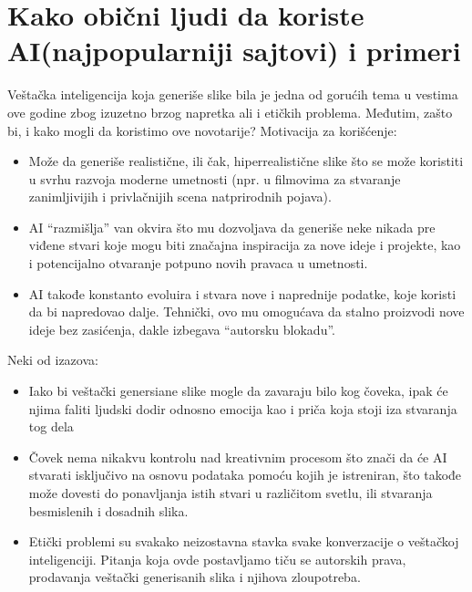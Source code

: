 \documentclass[12pt, letterpaper]{article}
\begin{document}
\section{Kako obični ljudi da koriste AI(najpopularniji sajtovi) i primeri}
Veštačka inteligencija koja generiše slike bila je jedna od gorućih tema u vestima ove godine zbog izuzetno brzog napretka ali i etičkih problema. Međutim, zašto bi, i kako mogli da koristimo ove novotarije?
Motivacija za korišćenje:
\begin{itemize}
  \item Može da generiše realistične, ili čak, hiperrealistične slike što se može koristiti u svrhu razvoja moderne umetnosti (npr. u filmovima za stvaranje zanimljivijih i privlačnijih scena natprirodnih pojava).
  \item AI “razmišlja” van okvira što mu dozvoljava da generiše neke nikada pre viđene stvari koje mogu biti značajna inspiracija za nove ideje i projekte, kao i potencijalno otvaranje potpuno novih pravaca u umetnosti.
  \item AI takođe konstanto evoluira i stvara nove i naprednije podatke, koje koristi da bi napredovao dalje. Tehnički, ovo mu omogućava da stalno proizvodi nove ideje bez zasićenja, dakle izbegava “autorsku blokadu”.
\end{itemize}

Neki od izazova:
\begin{itemize}
    \item Iako bi veštački genersiane slike mogle da zavaraju bilo kog čoveka, ipak će njima faliti ljudski dodir odnosno emocija kao i priča koja stoji iza stvaranja tog dela
    \item Čovek nema nikakvu kontrolu nad kreativnim procesom što znači da će AI stvarati isključivo na osnovu podataka pomoću kojih je istreniran, što takođe može dovesti do ponavljanja istih stvari u različitom svetlu, ili stvaranja besmislenih i dosadnih slika.
    \item Etički problemi su svakako neizostavna stavka svake konverzacije o veštačkoj inteligenciji. Pitanja koja ovde postavljamo tiču se autorskih prava, prodavanja veštački generisanih slika i njihova zloupotreba. 
\end{itemize}
\end{document}
